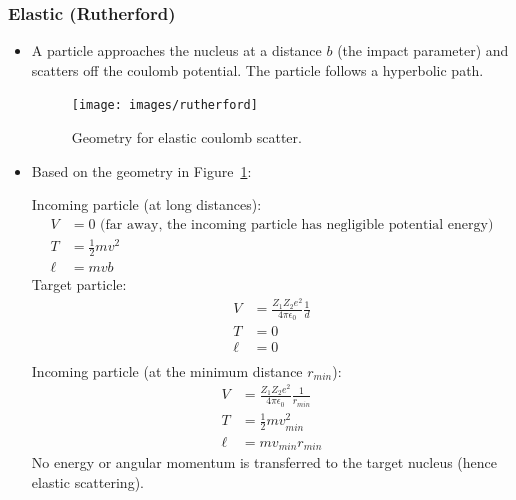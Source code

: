 \documentclass[letter]{article}
\begin{document}
\subsubsection{Elastic (Rutherford)}
\begin{itemize}
\item A particle approaches the nucleus at a distance $b$ (the impact
  parameter) and scatters off the coulomb potential. The particle
  follows a hyperbolic path.~\cite[pp. 396]{krane}
  \begin{figure}[hbtp]
    \centering
    \texttt{[image: images/rutherford]}
    \caption{Geometry for elastic coulomb scatter.~\cite[Lec
      24]{lecture}}
    \label{fig:rutherford}
  \end{figure}

\item Based on the geometry in Figure~\ref{fig:rutherford}:

Incoming particle (at long distances):
\begin{equation*}
  \begin{split}
    V &= 0 \text{ (far away, the incoming particle has negligible
      potential energy)}\\
    T &= \frac{1}{2}mv^2 \\
    \ell &= mvb
  \end{split}
\end{equation*}
Target particle:
\begin{equation*}
  \begin{split}
    V &= \frac{Z_1Z_2e^2}{4\pi\epsilon_0}\frac{1}{d} \\
    T &= 0 \\
    \ell &= 0 \\
  \end{split}
\end{equation*}
Incoming particle (at the minimum distance $r_{min}$):
\begin{equation*}
  \begin{split}
    V &= \frac{Z_1Z_2e^2}{4\pi\epsilon_0}\frac{1}{r_{min}} \\
    T &= \frac{1}{2}mv_{min}^2 \\
    \ell &= mv_{min}r_{min}
  \end{split}
\end{equation*}
No energy or angular momentum is transferred to the target nucleus (hence elastic
scattering).~\cite[Lec 24]{lecture}
\end{itemize}
\end{document}
